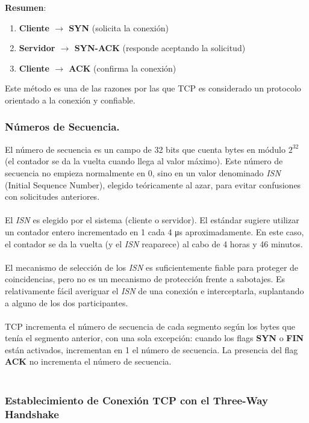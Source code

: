 \documentclass[a4paper,12pt]{article}
\begin{document}
\textbf{Resumen}:

\begin{enumerate}
    \item \textbf{Cliente $\to$ SYN} (solicita la conexión)
    \item \textbf{Servidor $\to$ SYN-ACK} (responde aceptando la solicitud)
    \item \textbf{Cliente $\to$ ACK} (confirma la conexión)
\end{enumerate}

Este método es una de las razones por las que TCP es considerado un protocolo orientado a la conexión y confiable.


\subsubsection{Números de Secuencia.}

El número de secuencia es un campo de 32 bits que cuenta bytes en módulo $2^{32}$ (el contador se da la vuelta cuando llega al valor máximo). Este número de secuencia no empieza normalmente en 0, sino en un valor denominado \textit{ISN} (Initial Sequence Number), elegido teóricamente al azar, para evitar confusiones con solicitudes anteriores.\\\\

El \textit{ISN} es elegido por el sistema (cliente o servidor). El estándar sugiere utilizar un contador entero incrementado en 1 cada 4 μs aproximadamente. En este caso, el contador se da la vuelta (y el \textit{ISN} reaparece) al cabo de 4 horas y 46 minutos.\\\\
El mecanismo de selección de los \textit{ISN} es suficientemente fiable para proteger de coincidencias, pero no es un mecanismo de protección frente a sabotajes. Es relativamente fácil averiguar el \textit{ISN} de una conexión e interceptarla, suplantando a alguno de los dos participantes.\\\\

TCP incrementa el número de secuencia de cada segmento según los bytes que tenía el segmento anterior, con una sola excepción: cuando los flags \textbf{SYN} o \textbf{FIN} están activados, incrementan en 1 el número de secuencia. La presencia del flag \textbf{ACK} no incrementa el número de secuencia.\\\\

\subsubsection{Establecimiento de Conexión TCP con el Three-Way Handshake}
\end{document}
